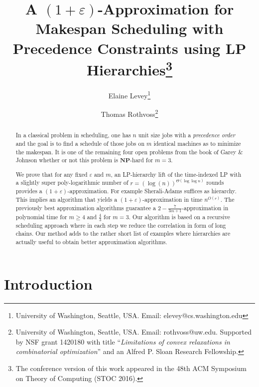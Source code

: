 \documentclass[11pt,letterpaper,oneside,english]{article}
\title{A $(1+\varepsilon)$-Approximation for Makespan Scheduling with Precedence Constraints using LP Hierarchies\footnote{The conference version of this work appeared in the 48th ACM Symposium on Theory of Computing (STOC 2016).}}
\date{}
\author{Elaine Levey\thanks{University of Washington, Seattle, USA. Email: elevey@cs.washington.edu} \and Thomas Rothvo{ss}\thanks{University of Washington, Seattle, USA. Email: rothvoss@uw.edu. Supported by NSF grant 1420180 with title ``\emph{Limitations of convex relaxations in combinatorial optimization}'' and an Alfred P. Sloan Research Fellowship.}}
\theoremstyle{theorem}
\begin{document}
\maketitle


\begin{abstract}
\noindent 
In a classical problem in scheduling, 
one has $n$ unit size jobs with a \emph{precedence order} and the goal is to find 
a schedule of those jobs on  $m$ identical machines as to minimize the makespan. It is one of the remaining four open problems from the book of Garey \& Johnson whether or not this problem is $\mathbf{NP}$-hard for $m=3$. 
 
We prove that for any fixed $\varepsilon$ and $m$, an LP-hierarchy lift of the time-indexed LP with a slightly super poly-logarithmic number of $r = (\log(n))^{\Theta(\log \log n)}$ rounds provides a $(1 + \varepsilon)$-approximation. 
For example Sherali-Adams suffices as hierarchy. This implies an algorithm that yields a $(1+\varepsilon)$-approximation in time $n^{O(r)}$. 
The previously best approximation algorithms guarantee
a $2 - \frac{7}{3m+1}$-approximation in polynomial time for $m \geq 4$ and $\frac{4}{3}$ for $m=3$. 
Our algorithm is based on a recursive scheduling approach where in each step we reduce the correlation in form of long chains. Our method adds to the rather short list of examples where hierarchies are actually useful to obtain better approximation algorithms. 
\end{abstract}



\section{Introduction}
\end{document}
